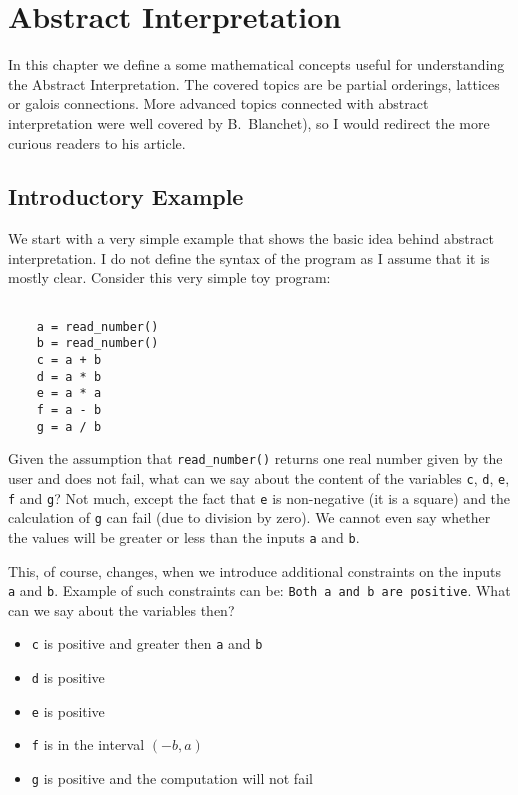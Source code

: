 \chapter{Abstract Interpretation}

In this chapter we define a some mathematical concepts useful for understanding the Abstract Interpretation.
The covered topics are be partial orderings, lattices or galois connections.
More advanced topics connected with abstract interpretation were well covered by B.~Blanchet\cite{Blanchet:2002:AI}),
so I would redirect the more curious readers to his article.


\section{Introductory Example} %

We start with a very simple example that shows the basic idea behind abstract interpretation.
I do not define the syntax of the program as I assume that it is mostly clear. %
Consider this very simple toy program:

\begin{verbatim}

    a = read_number()
    b = read_number()
    c = a + b
    d = a * b
    e = a * a
    f = a - b
    g = a / b

\end{verbatim}

Given the assumption that \verb|read_number()| returns one real number given by the user and does not fail, what can
we say about the content of the variables \verb|c|, \verb|d|, \verb|e|, \verb|f| and \verb|g|?
Not much, except the fact that \verb|e| is non-negative (it is a square) and the calculation of \verb|g| can fail
(due to division by zero).
We cannot even say whether the values will be greater or less than the inputs \verb|a| and \verb|b|.

This, of course, changes, when we introduce additional constraints on the inputs \verb|a| and \verb|b|.
Example of such constraints can be: \verb|Both a and b are positive|.
What can we say about the variables then?
\begin{itemize}
    \item \verb|c| is positive and greater then \verb|a| and \verb|b|
    \item \verb|d| is positive
    \item \verb|e| is positive
    \item \verb|f| is in the interval $(-b, a)$
    \item \verb|g| is positive and the computation will not fail
\end{itemize}

